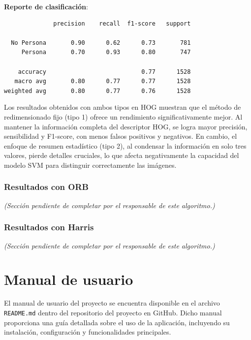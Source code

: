 \documentclass[a4paper]{article}
\begin{document}
\textbf{Reporte de clasificación}:

\begin{verbatim}
              precision    recall  f1-score   support

  No Persona       0.90      0.62      0.73       781
     Persona       0.70      0.93      0.80       747

    accuracy                           0.77      1528
   macro avg       0.80      0.77      0.77      1528
weighted avg       0.80      0.77      0.76      1528
\end{verbatim}

Los resultados obtenidos con ambos tipos en HOG muestran que el método de redimensionado 
fijo (tipo 1) ofrece un rendimiento significativamente mejor. Al mantener la información 
completa del descriptor HOG, se logra mayor precisión, sensibilidad y F1-score, con menos 
falsos positivos y negativos. En cambio, el enfoque de resumen estadístico (tipo 2), al 
condensar la información en solo tres valores, pierde detalles cruciales, lo que afecta negativamente 
la capacidad del modelo SVM para distinguir correctamente las imágenes.


\vspace{0.5cm}
\subsubsection*{Resultados con ORB}

\textit{(Sección pendiente de completar por el responsable de este algoritmo.)}

\vspace{0.5cm}
\subsubsection*{Resultados con Harris}

\textit{(Sección pendiente de completar por el responsable de este algoritmo.)}
\newpage

\section{Manual de usuario}

El manual de usuario del proyecto se encuentra disponible en el archivo \texttt{README.md} dentro del repositorio del proyecto en GitHub. Dicho manual proporciona una guía detallada sobre el uso de la aplicación, incluyendo su instalación, configuración y funcionalidades principales.
\par\hspace{1cm}
\end{document}
